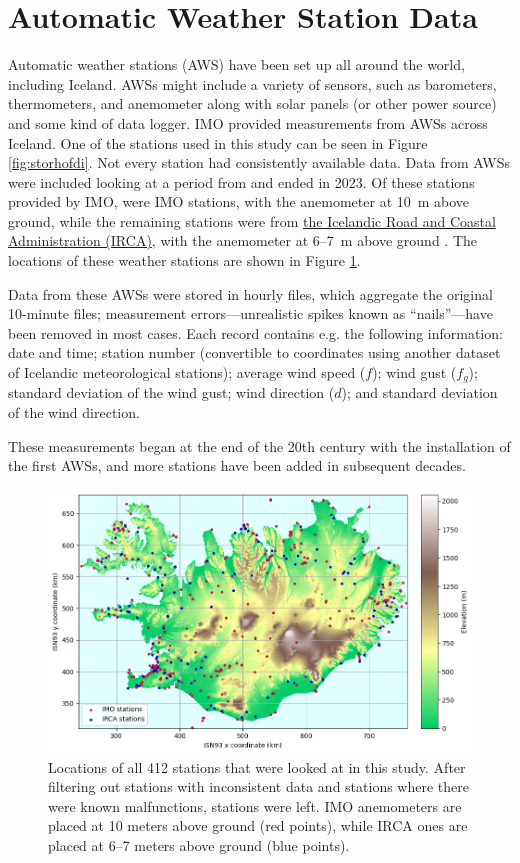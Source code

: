 \section{Automatic Weather Station Data}
Automatic weather stations (AWS) have been set up all around the world, including Iceland. AWSs might include a variety of sensors, such as barometers, thermometers, and anemometer along with solar panels (or other power source) and some kind of data logger. IMO provided measurements from AWSs across Iceland. One of the stations used in this study can be seen in Figure \ref{fig:storhofdi}. Not every station had consistently available data. Data from \nStationsMin AWSs were included looking at a period from \startDateVedur and ended in 2023. Of these \nStationsMin stations provided by IMO, \nVedurMin were IMO stations, with the anemometer at 10~m above ground, while the remaining \nVGMin stations were from \href{https://www.vegagerdin.is/}{the Icelandic Road and Coastal Administration (IRCA)}, with the anemometer at 6–7~m above ground \cite{vegagerdin_postur}. The locations of these weather stations are shown in Figure \ref{fig:aws_map}.

Data from these AWSs were stored in hourly files, which aggregate the original 10-minute files; measurement errors—unrealistic spikes known as “nails”—have been removed in most cases. Each record contains e.g. the following information: date and time; station number (convertible to coordinates using another dataset of Icelandic meteorological stations); average wind speed ($f$); wind gust ($f_g$); standard deviation of the wind gust; wind direction ($d$); and standard deviation of the wind direction.

These measurements began at the end of the 20th century with the installation of the first AWSs, and more stations have been added in subsequent decades.

\begin{figure}
    \centering
    \includegraphics[width=1.1\textwidth]{Figures/station_elevations.png}
    \caption[Locations of automatic weather stations in Iceland]{Locations of all 412 stations that were looked at in this study. After filtering out stations with inconsistent data and stations where there were known malfunctions, \nStationsMin stations were left. IMO anemometers are placed at 10 meters above ground (red points), while IRCA ones are placed at 6--7 meters above ground (blue points).}
    \label{fig:aws_map}
\end{figure}

